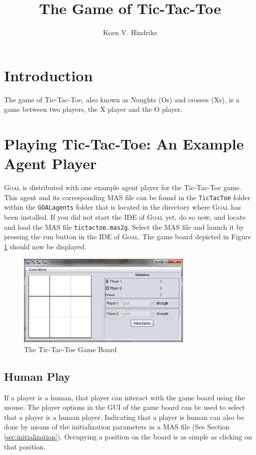 \documentclass{article}
\newcommand{\GOAL}{\textsc{Goal}\xspace}
\begin{document}
%
%
%
\title{The Game of Tic-Tac-Toe}
\author{Koen V. Hindriks}
\maketitle

%
%
%
\section{Introduction}
%
The game of Tic-Tac-Toe, also known as Noughts (Os) and crosses (Xs), is a game between two players, the X player and the O player.

%
%
%
\section{Playing Tic-Tac-Toe: An Example Agent Player}
%
\GOAL is distributed with one example agent player for the Tic-Tac-Toe game. This agent and its corresponding MAS file can be found in the \texttt{TicTacToe}
folder within the \texttt{GOALagents} folder that is located in the directory where \GOAL has been installed. If you did not start the IDE of \GOAL yet, do so now, and locate and load the MAS file \texttt{tictactoe.mas2g}. Select the MAS file and launch it by pressing the run button in the IDE of \GOAL. The game board depicted in Figure \ref{fig:gameBoard} should now be displayed.

\begin{figure}[h!]
\centering
    \includegraphics[width=0.75\textwidth]{gameBoard}
  \caption{The Tic-Tac-Toe Game Board}\label{fig:gameBoard}
\end{figure}


%
%
\subsection{Human Play}
%
If a player is a human, that player can interact with the game board using the mouse. The player options in the GUI of the game board can be used to select that a player is a human player. Indicating that a player is human can also be done by means of the initialization parameters in a MAS file (See Section \ref{sec:initialization}). Occupying a position on the board is as simple as clicking on that position.
\end{document}
